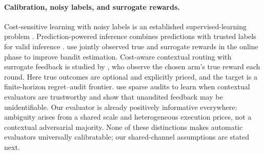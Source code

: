 \paragraph{Calibration, noisy labels, and surrogate rewards.}
Cost-sensitive learning with noisy labels is an established supervised-learning problem \citep{natarajan2017}. Prediction-powered inference combines predictions with trusted labels for valid inference \citep{angelopoulos2023}. \citet{ji2026} use jointly observed true and surrogate rewards in the online phase to improve bandit estimation. Cost-aware contextual routing with surrogate feedback is studied by \citet{sridhar2026}, who observe the chosen arm's true reward each round. Here true outcomes are optional and explicitly priced, and the target is a finite-horizon regret--audit frontier. \citet{ghasemi2026} use sparse audits to learn when contextual evaluators are trustworthy and show that unaudited feedback may be unidentifiable. Our evaluator is already positively informative everywhere: ambiguity arises from a shared scale and heterogeneous execution prices, not a contextual adversarial majority. None of these distinctions makes automatic evaluators universally calibratable; our shared-channel assumptions are stated next.

